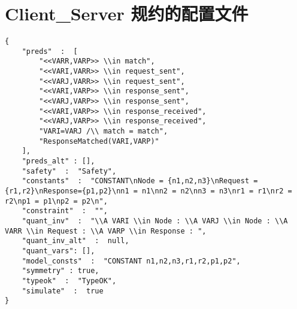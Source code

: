\chapter{Client\_Server 规约的配置文件}\label{app:client_server_config}
\begin{lstlisting}
{
    "preds"  :  [
        "<<VARR,VARP>> \\in match",
        "<<VARI,VARR>> \\in request_sent",
        "<<VARJ,VARR>> \\in request_sent",
        "<<VARI,VARP>> \\in response_sent",
        "<<VARJ,VARP>> \\in response_sent",
        "<<VARI,VARP>> \\in response_received",
        "<<VARJ,VARP>> \\in response_received",
        "VARI=VARJ /\\ match = match",
        "ResponseMatched(VARI,VARP)"
    ],
    "preds_alt" : [],
    "safety"  :  "Safety",
    "constants"  :  "CONSTANT\nNode = {n1,n2,n3}\nRequest = {r1,r2}\nResponse={p1,p2}\nn1 = n1\nn2 = n2\nn3 = n3\nr1 = r1\nr2 = r2\np1 = p1\np2 = p2\n",
    "constraint"  :  "",
    "quant_inv"  :  "\\A VARI \\in Node : \\A VARJ \\in Node : \\A VARR \\in Request : \\A VARP \\in Response : ",
    "quant_inv_alt"  :  null,
    "quant_vars": [],
    "model_consts"  :  "CONSTANT n1,n2,n3,r1,r2,p1,p2",
    "symmetry" : true,
    "typeok"  :  "TypeOK",
    "simulate"  :  true      
}
\end{lstlisting}